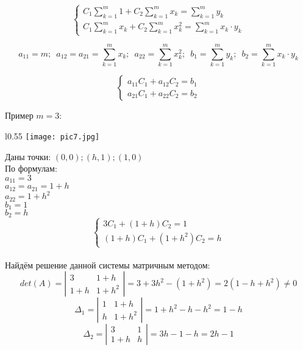 \documentclass[12pt]{article}
\begin{document}
\begin{equation*}
	\begin{cases}
		C_1 \sum_{k=1}^{m}1 + C_2 \sum_{k=1}^{m}x_k = \sum_{k=1}^{m}y_k \\
		C_1 \sum_{k=1}^{m}x_k + C_2 \sum_{k=1}^{m}x_k^2 = \sum_{k=1}^{m}x_k \cdot y_k
	\end{cases}
\end{equation*}

\[
  a_{11} = m; \hspace{6pt} a_{12} = a_{21} = \sum_{k=1}^{m}x_k;
	\hspace{6pt} a_{22} = \sum_{k=1}^{m}x_k^2; \hspace{6pt}
	b_1 = \sum_{k=1}^{m}y_k; \hspace{6pt} b_2 = \sum_{k=1}^{m} x_k \cdot y_k
\]

\begin{equation*}
	\begin{cases}
		a_{11} C_1 + a_{12} C_2 = b_1 \\
		a_{21} C_1 + a_{22} C_2 = b_2
	\end{cases}
\end{equation*}

Пример \( m = 3 \):

\begin{wrapfigure}{l}{0.55\textwidth}
  \texttt{[image: pic7.jpg]} 
\end{wrapfigure}

Даны точки: \( (0,0); (h, 1); (1, 0) \)\\

По формулам:\\
\( a_{11} = 3 \)\\
\( a_{12} = a_{21} = 1 + h \)\\
\( a_{22} = 1 + h^2 \)\\
\( b_1 = 1 \)\\
\( b_2 = h \)
\begin{equation*}
  \begin{cases}
    3 C_1 + (1 + h) C_2 = 1\\
    (1 + h) C_1 + (1 + h^2) C_2 = h
  \end{cases}
\end{equation*}\\

Найдём решение данной системы матричным методом:
\[
  det(A) = \left|
  \begin{matrix}
    3 & 1+h\\
    1+h & 1+h^2
  \end{matrix}
  \right| = 3 + 3 h^2 - (1 + h^2) = 2 (1 - h + h^2) \neq 0
\] 
\[
  \Delta_1 = \left|
  \begin{matrix}
    1 & 1 + h\\
    h & 1 + h^2
  \end{matrix}
  \right| = 1 + h^2 - h - h^2 = 1 - h
\] 
\[
  \Delta_2 = \left|
  \begin{matrix}
    3 & 1\\
    1+h & h
  \end{matrix}
  \right| = 3 h - 1 - h = 2 h - 1
\] 
\end{document}
